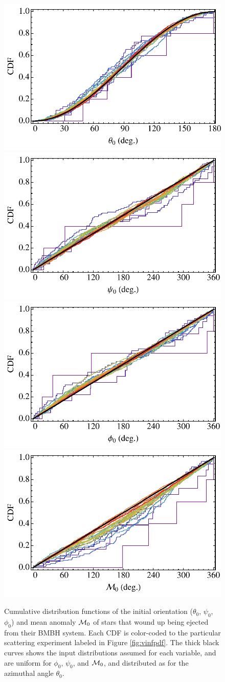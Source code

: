 \documentclass[a4paper,twocolumn]{emulateapj}
\begin{document}
\begin{figure}
\centering\includegraphics[width=0.45\linewidth,clip=true]{thetaCDF}\includegraphics[width=0.45\linewidth,clip=true]{psiCDF}\\
\centering\includegraphics[width=0.45\linewidth,clip=true]{phiCDF}\includegraphics[width=0.45\linewidth,clip=true]{MCDF}
\caption{Cumulative distribution functions of the initial orientation ($\theta_{0}$, $\psi_{0}$, $\phi_{0}$) and mean anomaly ${\cal M}_{0}$ of stars that wound up being ejected from their BMBH system. Each CDF is color-coded to the particular scattering experiment labeled in Figure \ref{fig:vinfpdf}. The thick black curves shows the input distributions assumed for each variable, and are uniform for $\phi_{0}$, $\psi_{0}$, and ${\cal M}_{0}$, and distributed as  for the azimuthal angle $\theta_{0}$.}
\label{fig:angle0}
\end{figure}
\end{document}
